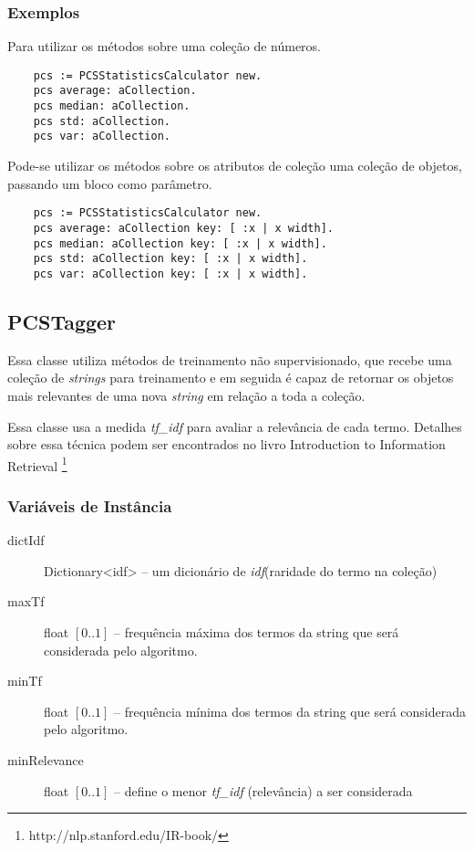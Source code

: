 \subsubsection{Exemplos}
Para utilizar os métodos sobre uma coleção de números.
    \begin{verbatim}
    pcs := PCSStatisticsCalculator new.
    pcs average: aCollection.
    pcs median: aCollection.
    pcs std: aCollection.
    pcs var: aCollection.
    \end{verbatim}

Pode-se utilizar os métodos sobre os atributos de coleção uma coleção de objetos, passando um
bloco como parâmetro.
    \begin{verbatim}
    pcs := PCSStatisticsCalculator new.
    pcs average: aCollection key: [ :x | x width].
    pcs median: aCollection key: [ :x | x width].
    pcs std: aCollection key: [ :x | x width].
    pcs var: aCollection key: [ :x | x width].
    \end{verbatim}


    
\subsection{PCSTagger}

Essa classe utiliza métodos de treinamento não supervisionado, que recebe uma coleção de
\textit{strings} para treinamento e em seguida é capaz de retornar os objetos mais relevantes
de uma nova \textit{string} em relação a toda a coleção.

Essa classe usa a medida \textit{tf\_idf} para avaliar a relevância de cada termo. Detalhes sobre
essa técnica podem ser encontrados no livro Introduction to Information Retrieval
\footnote{http://nlp.stanford.edu/IR-book/}

\subsubsection{Variáveis de Instância}
    
\begin{description}
    \item[dictIdf] Dictionary<idf> -- um dicionário de \textit{idf}(raridade do termo na
                   coleção)
    \item[maxTf] float $[0..1]$ -- frequência máxima dos termos da string que será considerada
                 pelo algoritmo.
    \item[minTf] float $[0..1]$ -- frequência mínima dos termos da string que será considerada
                 pelo algoritmo.
    \item[minRelevance] float $[0..1]$ --  define o menor \textit{tf\_idf} (relevância) a ser
                        considerada
    
\end{description}


